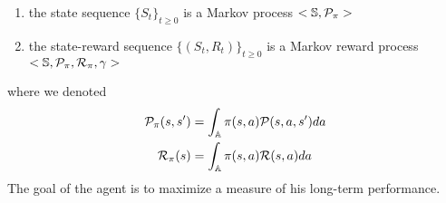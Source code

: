 \begin{enumerate}[label={\roman*)}]
	\item the state sequence ${\{S_t\}}_{t\geq 0}$ is a Markov process $<\mathbb{S},
		  \mathcal{P}_\pi>$
	  \item the state-reward sequence ${\{(S_t, R_t)\}}_{t\geq 0}$ is a Markov 
		  reward process $<\mathbb{S}, \mathcal{P}_\pi, \mathcal{R}_\pi, \gamma>$
\end{enumerate}
where we denoted 
\begin{equation}
	\begin{split}
		\mathcal{P}_\pi(s, s') &= \int_{\mathbb{A}} \pi(s, a) \mathcal{P}(s, a, s') da\\
		\mathcal{R}_\pi(s) &= \int_{\mathbb{A}} \pi(s, a) \mathcal{R}(s, a) da\\
	\end{split}
\end{equation}
The goal of the agent is to maximize a measure of his long-term performance.

